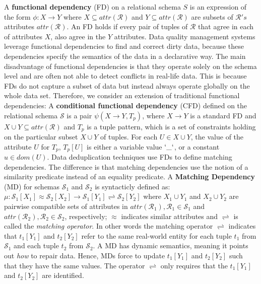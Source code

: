 A \textbf{functional dependency} (FD) on a relational schema $S$ is an expression of the form $\phi: X \rightarrow Y$ where $X \subseteq attr(\mathcal{R}) $ and $Y \subseteq attr(\mathcal{R}) $ are subsets of $\mathcal{R}'s$ attributes $attr(\mathcal{R})$. An FD holds if every pair of tuples of $\mathcal{R}$ that agree in each of attributes $X$, also agree in the $Y$ attributes. Data quality management systems leverage functional dependencies to find and correct dirty data, because these dependencies specify the semantics of the data in a declarative way. The main disadvantage of functional dependencies is that they operate solely on the schema level and are often not able to detect conflicts in real-life data. This is because FDs do not capture a subset of data but instead always operate globally on the whole data set.
Therefore, we consider an extension of traditional functional dependencies:  A \textbf{conditional functional dependency} (CFD) 
defined on the relational schema $\mathcal{S}$ is a pair $\psi(X \rightarrow Y , T_p)$,  where $X \rightarrow Y$ is a standard 
FD and $X \cup Y \subseteq attr(\mathcal{R})$ and $T_p$ is a tuple pattern, which is a set of constraints holding on the particular 
subset $X \cup Y$ of tuples. For each $U \in X \cup Y$, the value of the attribute $U$ for $T_p$, $T_p[U]$ is either a variable 
value $`\_`$, or a constant $u \in dom(U)$. Data deduplication techniques use FDs to define matching dependencies. The 
difference is that matching dependencies use the notion of a similarity predicate instead of an equality predicate. A 
\textbf{Matching Dependency} (MD) for schemas $\mathcal{S}_1$ and $\mathcal{S}_2$ is syntacticly defined as:
$\mu: \mathcal{S}_1[X_1]\approx \mathcal{S}_2[X_2]\rightarrow \mathcal{S}_1[Y_1]\rightleftharpoons \mathcal{S}_2[Y_2]$ 
where $X_1 \cup Y_1$ and $X_2 \cup Y_2$ are pairwise compatible sets of attributes in $attr(\mathcal{R}_1), \mathcal{R}_1\in \mathcal{S}_1$ 
and $attr(\mathcal{R}_2), \mathcal{R}_2\in \mathcal{S}_2$, respectively; $\approx$ indicates similar attributes and $\rightleftharpoons$ 
is called the \textit{matching operator}. In other words the matching operator $\rightleftharpoons$ indicates that $t_1[Y_1]$ and $t_2[Y_2]$ refer to the same real-world entity for each tuple $t_1$ from $\mathcal{S}_1$  and each tuple $t_2$ from $\mathcal{S}_2$. A MD has dynamic semantics, meaning it points out \textit{how} to repair data. Hence, MDs force to update $t_1[Y_1]$ and $t_2[Y_2]$ such that they have the same values. %
The operator $\rightleftharpoons$ only requires that the $t_1[Y_1]$ and $t_2[Y_2]$ are identified.
